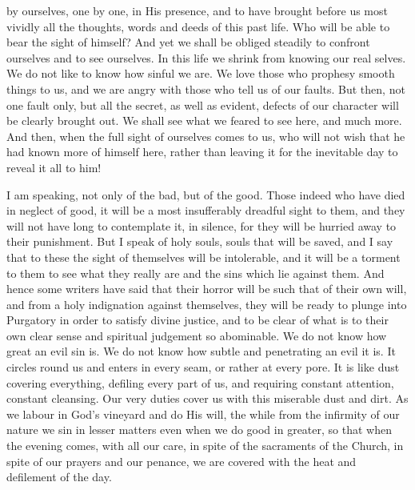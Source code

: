by ourselves, one by one, in His presence, and to have brought
before us most vividly all the thoughts, words and deeds of this past
life. Who will be able to bear the sight of himself? And yet we shall
be obliged steadily to confront ourselves and to see ourselves. In
this life we shrink from knowing our real selves. We do not like to
know how sinful we are. We love those who prophesy smooth things to
us, and we are angry with those who tell us of our faults. But then,
not one fault only, but all the secret, as well as evident, defects of
our character will be clearly brought out. We shall see what we feared
to see here, and much more. And then, when the full sight of ourselves
comes to us, who will not wish that he had known more of himself here,
rather than leaving it for the inevitable day to reveal it all to him!

I am speaking, not only of the bad, but of the
good. Those indeed who have died in neglect of good, it will be a most
insufferably dreadful sight to them, and they will not have long to
contemplate it, in silence, for they will be hurried away to their
punishment. But I speak of holy souls, souls that will be saved, and I
say that to these the sight of themselves will be intolerable, and it
will be a torment to them to see what they really are and the sins
which lie against them. And hence some writers have said that their
horror will be such that of their own will, and from a holy
indignation against themselves, they will be ready to plunge into
Purgatory in order to satisfy divine justice, and to be clear of
what is to their own clear sense and spiritual judgement so
abominable. We do not know how great an evil sin is. We do not know
how subtle and penetrating an evil it is. It circles round us and
enters in every seam, or rather at every pore. It is like dust
covering everything, defiling every part of us, and requiring constant
attention, constant cleansing. Our very duties cover us with this
miserable dust and dirt. As we labour in God's vineyard and do His
will, the while from the infirmity of our nature we sin in lesser
matters even when we do good in greater, so that when the evening
comes, with all our care, in spite of the sacraments of the Church, in
spite of our prayers and our penance, we are covered with the heat and
defilement of the day.

